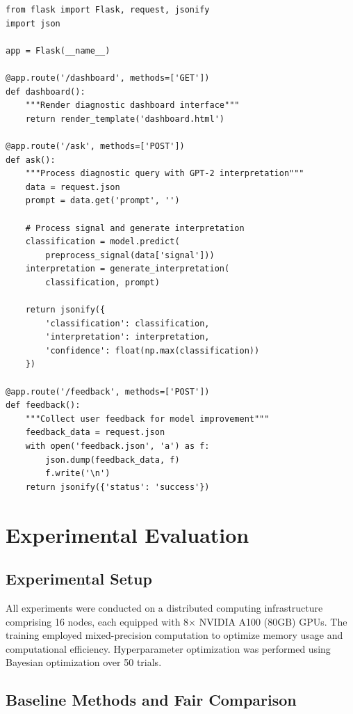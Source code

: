 \documentclass[conference]{IEEEtran}
\begin{document}
\begin{lstlisting}[caption={REST API endpoint implementation},label={lst:api}]
from flask import Flask, request, jsonify
import json

app = Flask(__name__)

@app.route('/dashboard', methods=['GET'])
def dashboard():
    """Render diagnostic dashboard interface"""
    return render_template('dashboard.html')

@app.route('/ask', methods=['POST'])
def ask():
    """Process diagnostic query with GPT-2 interpretation"""
    data = request.json
    prompt = data.get('prompt', '')
    
    # Process signal and generate interpretation
    classification = model.predict(
        preprocess_signal(data['signal']))
    interpretation = generate_interpretation(
        classification, prompt)
    
    return jsonify({
        'classification': classification,
        'interpretation': interpretation,
        'confidence': float(np.max(classification))
    })

@app.route('/feedback', methods=['POST'])
def feedback():
    """Collect user feedback for model improvement"""
    feedback_data = request.json
    with open('feedback.json', 'a') as f:
        json.dump(feedback_data, f)
        f.write('\n')
    return jsonify({'status': 'success'})
\end{lstlisting}

\section{Experimental Evaluation}

\subsection{Experimental Setup}

All experiments were conducted on a distributed computing infrastructure comprising 16 nodes, each equipped with 8× NVIDIA A100 (80GB) GPUs. The training employed mixed-precision computation to optimize memory usage and computational efficiency. Hyperparameter optimization was performed using Bayesian optimization over 50 trials.

\subsection{Baseline Methods and Fair Comparison}
\end{document}
